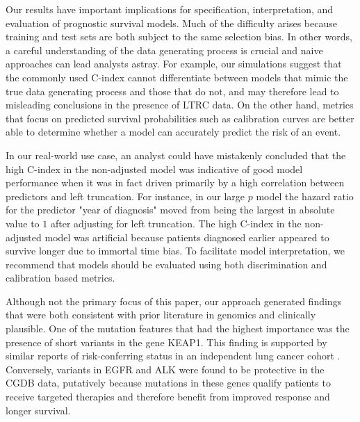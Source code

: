 \documentclass[11pt,final,fleqn]{article}\usepackage[]{graphicx}\usepackage[]{color}
\theoremstyle{plain}
\begin{document}
Our results have important implications for specification, interpretation, and evaluation of prognostic survival models. Much of the difficulty arises because training and test sets are both subject to the same selection bias. In other words, a careful understanding of the data generating process is crucial and naive approaches can lead analysts astray. For example, our simulations suggest that the commonly used C-index cannot differentiate between models that mimic the true data generating process and those that do not, and may therefore lead to misleading conclusions in the presence of LTRC data. On the other hand, metrics that focus on predicted survival probabilities such as calibration curves are better able to determine whether a model can accurately predict the risk of an event.  

In our real-world use case, an analyst could have mistakenly concluded that the high C-index in the non-adjusted model was indicative of good model performance when it was in fact driven primarily by a high correlation between predictors and left truncation. For instance, in our large $p$ model the hazard ratio for the predictor "year of diagnosis" moved from being the largest in absolute value to $1$ after adjusting for left truncation. The high C-index in the non-adjusted model was artificial because patients diagnosed earlier appeared to survive longer due to immortal time bias. To facilitate model interpretation, we recommend that models should be evaluated using both discrimination and calibration based metrics.

Although not the primary focus of this paper, our approach generated findings that were both consistent with prior literature in genomics and clinically plausible. One of the mutation features that had the highest importance was the presence of short variants in the gene KEAP1. This finding is supported by similar reports of risk-conferring status in an independent lung cancer cohort \cite{shen_harnessing_2019}. Conversely, variants in EGFR and ALK were found to be protective in the CGDB data, putatively because mutations in these genes qualify patients to receive targeted therapies and therefore benefit from improved response and longer survival.
\end{document}
